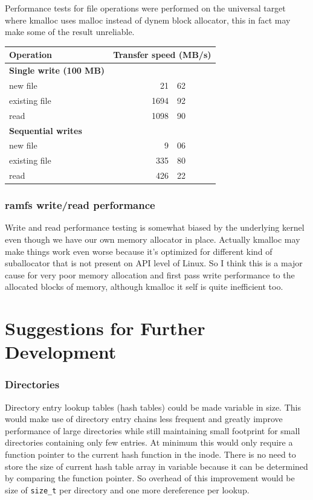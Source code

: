 Performance tests for file operations were performed on the universal target
where kmalloc uses malloc instead of dynem block allocator, this in fact may
make some of the result unreliable.

\begin{tabular}{l r@{.}l}
\textbf{Operation} &
\multicolumn{2}{c}{\textbf{Transfer speed (MB/s)}} \\
\hline
\textbf{Single write (100 MB)} && \\
new file      & 21&62 \\
existing file & 1694&92 \\
read          & 1098&90 \\
\textbf{Sequential writes} && \\
new file      & 9&06 \\
existing file & 335&80 \\
read          & 426&22 \\
\end{tabular}

\subsubsection{ramfs write/read performance}

Write and read performance testing is somewhat biased by the underlying kernel
even though we have our own memory allocator in place. Actually kmalloc may
make things work even worse because it's optimized for different kind of
suballocator that is not present on API level of Linux. So I think this is a
major cause for very poor memory allocation and first pass write performance
to the allocated blocks of memory, although kmalloc it self is quite inefficient
too.


\section{Suggestions for Further Development}

\subsubsection{Directories}

Directory entry lookup tables (hash tables) could be made variable in size.
This would make use of directory entry chains less frequent and greatly improve
performance of large directories while still maintaining small footprint for
small directories containing only few entries. At minimum this would only
require a function pointer to the current hash function in the inode. There is
no need to store the size of current hash table array in variable because it can
be determined by comparing the function pointer. So overhead of this improvement
would be size of \verb+size_t+ per directory and one more dereference per lookup.
